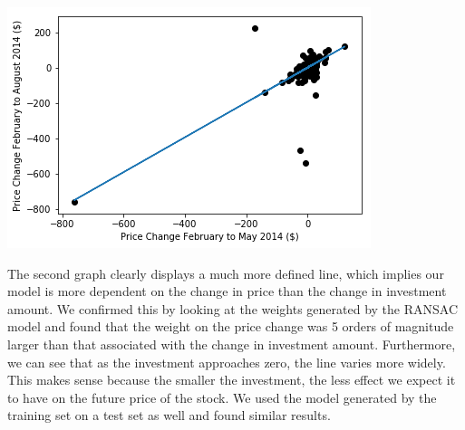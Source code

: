 \documentclass{article}
\begin{document}
\begin{multicols}{2}
\begin{center}
\includegraphics[scale = 0.43]{RansacTrainByPrice.png}
\end{center}
The second graph clearly displays a much more defined line, which implies our model is more dependent on the change in price than the change in investment amount. We confirmed this by looking at the weights generated by the RANSAC model and found that the weight on the price change was 5 orders of magnitude larger than that associated with the change in investment amount. Furthermore, we can see that as the investment approaches zero, the line varies more widely. This makes sense because the smaller the investment, the less effect we expect it to have on the future price of the stock. We used the model generated by the training set on a test set as well and found similar results. 


\end{multicols}
\end{document}
